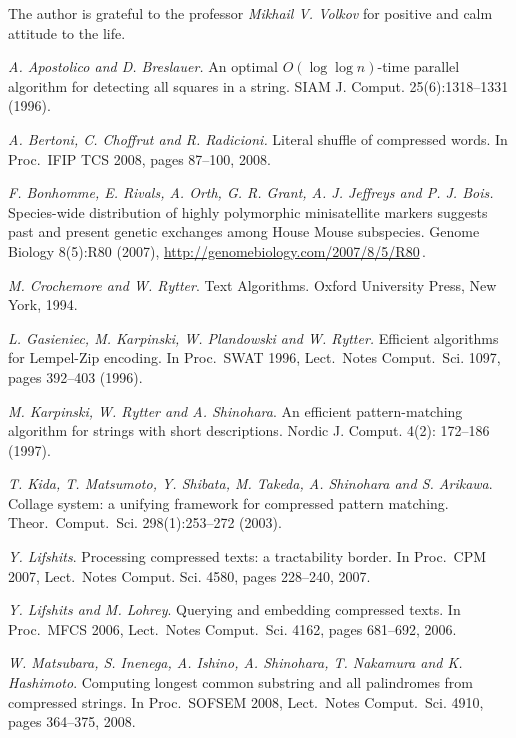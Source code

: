 \documentclass[11pt]{article}
\begin{document}
\bigskip

The author is grateful to the professor \emph{Mikhail V. Volkov} for positive and calm attitude to the life.
{\small

\begin{thebibliography}{99}
\itemsep -1pt
\emph{A. Apostolico and D. Breslauer.} An optimal $O(\log\log
n)$-time parallel algorithm for detecting all squares in a string.
SIAM J. Comput. 25(6):1318--1331 (1996).

\emph{A. Bertoni, C. Choffrut and R. Radicioni.} Literal shuffle
of compressed words. In Proc.\ IFIP TCS 2008, pages 87--100, 2008.

\emph{F. Bonhomme, E. Rivals, A. Orth, G. R. Grant, A. J. Jeffreys and P. J. Bois.}
Species-wide distribution of highly polymorphic minisatellite markers suggests past
and present genetic exchanges among House Mouse subspecies. Genome Biology
8(5):R80 (2007), \url{http://genomebiology.com/2007/8/5/R80}\,.

\emph{M. Crochemore and W. Rytter}. Text Algorithms. Oxford
University Press, New York, 1994.

\emph{L. Gasieniec, M. Karpinski, W. Plandowski and W. Rytter.}
Efficient algorithms for Lempel-Zip encoding. In Proc.\ SWAT 1996,
Lect.\ Notes Comput.\ Sci. 1097, pages 392--403 (1996).

\emph{M. Karpinski, W. Rytter and A. Shinohara}. An efficient
pattern-matching algorithm for strings with short descriptions.
Nordic J. Comput. 4(2): 172--186 (1997).

\emph{T. Kida, T. Matsumoto, Y. Shibata, M. Takeda, A. Shinohara
and S. Arikawa}. Collage system: a unifying framework for
compressed pattern matching. Theor.\ Comput.\ Sci. 298(1):253--272
(2003).

\emph{Y. Lifshits}. Processing compressed texts: a tractability
border. In Proc.\ CPM 2007, Lect.\ Notes Comput. Sci. 4580, pages
228--240, 2007.

\emph{Y. Lifshits and M. Lohrey}. Querying and embedding
compressed texts. In Proc.\ MFCS 2006, Lect.\ Notes Comput.\ Sci.
4162, pages 681--692, 2006.

\emph{W. Matsubara, S. Inenega, A. Ishino, A. Shinohara, T.
Nakamura and K. Hashimoto}. Computing longest common substring and
all palindromes from compressed strings. In Proc.\ SOFSEM 2008,
Lect.\ Notes Comput.\ Sci. 4910, pages 364--375, 2008.


\end{thebibliography}}
\end{document}
